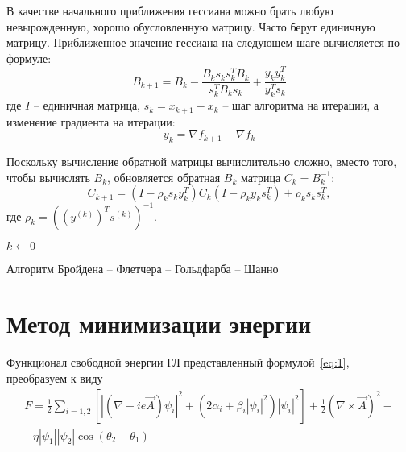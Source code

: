 В качестве начального приближения гессиана можно брать любую невырожденную, 
хорошо обусловленную матрицу. Часто берут единичную матрицу. Приближенное 
значение гессиана на следующем шаге вычисляется по формуле:
\[ 
    B_{k + 1} = B_k - \frac{B_k s_k s_k^T B_k}{s_k^T B_k s_k} + 
        \frac{y_k y_k^T}{y_k^T s_k} 
\]
где \( I \) -- единичная матрица, \( s_k = x_{k + 1} - x_k \) -- шаг алгоритма 
на итерации, а изменение градиента на итерации:
\begin{equation} 
    y_k = \nabla f_{k + 1} - \nabla f_{k} 
    \label{eq:y_k}
\end{equation}

Поскольку вычисление обратной матрицы вычислительно сложно, вместо того, 
чтобы вычислять \( B_k \), обновляется обратная \( B_k \) матрица 
\( C_k = B_k^{-1} \):
\begin{equation}
    C_{k + 1} = (I - \rho_k s_k y_k^T)C_k(I - \rho_k y_k s_k^T) + 
        \rho_k s_k s_k^T, 
    \label{eq:c_k}
\end{equation}
где \( \rho_k = ((y^{(k)})^T s^{(k)})^{-1} \).

\clearpage

\begin{algorithm}[H]
    \SetAlgoLined
    $k \gets 0$\;
    \caption{Алгоритм Бройдена -- Флетчера -- Гольдфарба -- Шанно 
        \cite{skajaa2010limited}}
\end{algorithm}

\section{Метод минимизации энергии}

Функционал свободной энергии ГЛ представленный формулой~\eqref{eq:1}, 
преобразуем к виду
\begin{gather}
    F = \frac{1}{2}\sum\limits_{i=1,2}\left[ 
        \left|\left( \nabla + ie\vec{A}\right)\psi_i\right|^2 + 
        \left( 2\alpha_i + \beta_i |\psi_i|^2 \right)|\psi_i|^2 \right] + 
        \frac{1}{2}\left( \nabla\times\vec{A} \right)^2 - \nonumber \\
        - \eta|\psi_1||\psi_2|\cos(\theta_2-\theta_1)
    \label{eqm:1}
\end{gather}

